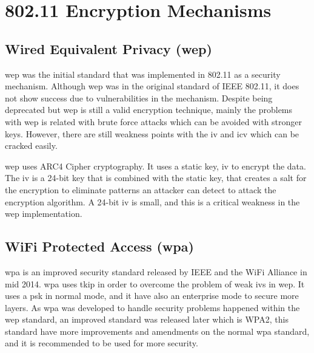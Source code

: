 \chapter{802.11 Encryption Mechanisms}
\label{chap:encryption}

\section{Wired Equivalent Privacy (\ac{wep})}
\label{sec:wep}
\ac{wep} was the initial standard that was implemented in 802.11 as a security mechanism. Although \ac{wep} was in the
original standard of IEEE 802.11, it does not show success due to vulnerabilities in the mechanism. Despite being deprecated
but \ac{wep} is still a valid encryption technique, mainly the problems with \ac{wep} is related with brute force attacks
which can be avoided with stronger keys. However, there are still weakness points with the \ac{iv} and \ac{icv} which can be cracked
easily.\cite{edney_arbaugh_2004}

\newParagraph
\ac{wep} uses ARC4 Cipher cryptography. It uses a static key, \ac{iv} to encrypt the data. The \ac{iv} is a 24-bit key
that is combined with the static key, that creates a salt for the encryption to eliminate patterns an attacker
can detect to attack the encryption algorithm. A 24-bit \ac{iv} is small, and this is a critical weakness in the
\ac{wep} implementation.\cite{edney_arbaugh_2004}

\section{WiFi Protected Access (\ac{wpa})}
\label{sec:wpa}

\ac{wpa} is an improved security standard released by IEEE and the WiFi Alliance in mid 2014.\cite{gast_2005}
\ac{wpa} uses \ac{tkip} in order to overcome the problem of weak \ac{iv}s in \ac{wep}. It uses a \ac{psk} in normal
mode, and it have also an enterprise mode to secure more layers.\cite{mogollon_2007} As \ac{wpa} was developed to handle
security problems happened within the \ac{wep} standard, an improved standard was released later which is WPA2, this
standard have more improvements and amendments on the normal \ac{wpa} standard, and it is recommended to be used for more
security.\cite{garzia}
